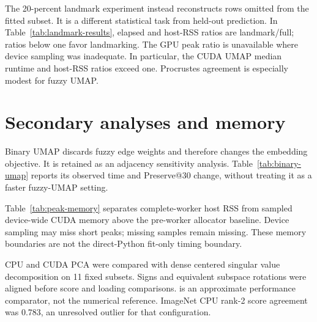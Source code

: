 \documentclass[article]{jss}
\begin{document}


The 20-percent landmark experiment instead reconstructs rows omitted from
the fitted subset. It is a different statistical task from held-out
prediction. In Table~\ref{tab:landmark-results}, elapsed and host-RSS ratios
are landmark/full; ratios below one favor landmarking. The GPU peak ratio
is unavailable where device sampling was inadequate. In particular, the
CUDA UMAP median runtime and host-RSS ratios exceed one. Procrustes
agreement is especially modest for fuzzy UMAP.

\begin{table}[htbp]
\centering
\scriptsize
\caption{Landmark reconstruction over 11 data sets in campaign
  20260930T203319Z. Each row is the median of data-set medians for a
  20-percent landmark fraction. RSS covers isolated fit workers; -- means
  insufficient device-memory evidence.}
\label{tab:landmark-results}

\end{table}

\section{Secondary analyses and memory}

Binary UMAP discards fuzzy edge weights and therefore changes the
embedding objective. It is retained as an adjacency sensitivity analysis.
Table~\ref{tab:binary-umap} reports its observed time and Preserve@30
change, without treating it as a faster fuzzy-UMAP setting.



Table~\ref{tab:peak-memory} separates complete-worker host RSS from sampled
device-wide CUDA memory above the pre-worker allocator baseline. Device
sampling may miss short peaks; missing samples remain missing. These
memory boundaries are not the direct-Python fit-only timing boundary.



CPU and CUDA PCA were compared with dense centered singular value
decomposition on 11 fixed subsets. Signs and equivalent subspace
rotations were aligned before score and loading comparisons.
 is an approximate performance comparator, not the numerical
reference. ImageNet CPU rank-2 score agreement was 0.783, an unresolved
outlier for that configuration.


\end{document}

